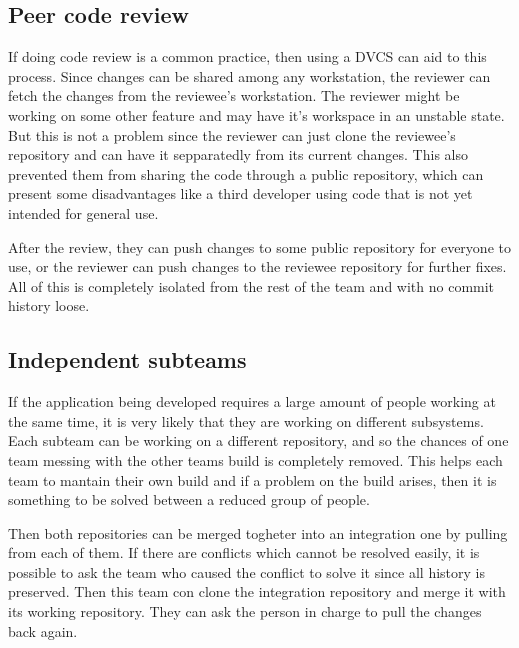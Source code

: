 \documentclass[%
	final,
	notitlepage,
	narroweqnarray,
	inline,
	twoside,
	]{ieee}
\begin{document}
\subsection{Peer code review}
If doing code review is a common practice, then using a DVCS can aid to this process. Since changes can be shared
among any workstation, the reviewer can fetch the changes from the reviewee's workstation. The reviewer might be
working on some other feature and may have it's workspace in an unstable state. But this is not a problem since the
reviewer can just clone the reviewee's repository and can have it sepparatedly from its current changes.
This also prevented them from sharing the code through a public repository, which can present some disadvantages like
a third developer using code that is not yet intended for general use.

After the review, they can push changes to some public repository for everyone to use, or the reviewer can push changes to the reviewee repository for further fixes. All of this is completely isolated from the rest of the team and with no commit history loose.

\subsection{Independent subteams}
If the application being developed requires a large amount of people working at the same time, it is very likely that they are working on different subsystems. Each subteam can be working on a different repository, and so the chances of one team messing with the other teams build is completely removed. This helps each team to mantain their own build and if a problem on the build arises, then it is something to be solved between a reduced group of people.

Then both repositories can be merged togheter into an integration one by pulling from each of them. If there are conflicts which cannot be resolved easily, it is possible to ask the team who caused the conflict to solve it since all history is preserved. Then this team con clone the integration repository and merge it with its working repository. They can ask the person in charge to pull the changes back again.

\end{document}
